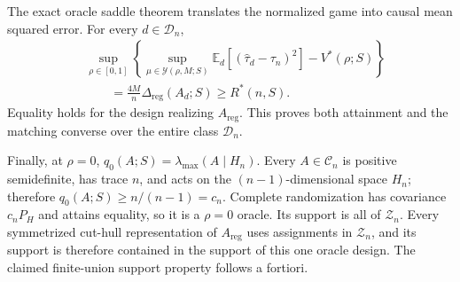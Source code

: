 The exact oracle saddle theorem translates the normalized game into causal mean squared error.  For every \(d\in\mathcal D_n\),
\[
\begin{aligned}
&\sup_{\rho\in[0,1]}
 \left\{
 \sup_{\mu\in\mathcal Y(\rho,M;S)}
 \mathbb E_d[(\widehat\tau_d-\tau_n)^2]-V^*(\rho;S)
 \right\}\\
&\qquad =\frac{4M}{n}\Delta_{\mathrm{reg}}(A_d;S)
 \geq R^*(n,S).
\end{aligned}
\]
Equality holds for the design realizing \(A_{\mathrm{reg}}\).  This proves both attainment and the matching converse over the entire class \(\mathcal D_n\).

Finally, at \(\rho=0\),
\(q_0(A;S)=\lambda_{\max}(A\mid H_n)\).  Every \(A\in\mathcal C_n\) is positive semidefinite, has trace \(n\), and acts on the \((n-1)\)-dimensional space \(H_n\); therefore \(q_0(A;S)\geq n/(n-1)=c_n\).  Complete randomization has covariance \(c_nP_H\) and attains equality, so it is a \(\rho=0\) oracle.  Its support is all of \(\mathcal Z_n\).  Every symmetrized cut-hull representation of \(A_{\mathrm{reg}}\) uses assignments in \(\mathcal Z_n\), and its support is therefore contained in the support of this one oracle design.  The claimed finite-union support property follows a fortiori.